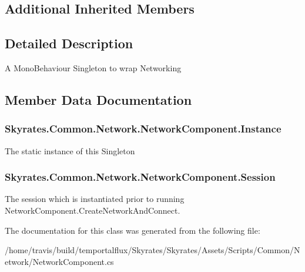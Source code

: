 \subsection*{Additional Inherited Members}


\subsection{Detailed Description}
A Mono\-Behaviour Singleton to wrap Networking 



\subsection{Member Data Documentation}
\hypertarget{class_skyrates_1_1_common_1_1_network_1_1_network_component_a92cfb5ea7ee95888c7d9356e6e1add2f}{
\subsubsection[{Instance}]{ Skyrates.\-Common.\-Network.\-Network\-Component.\-Instance\hspace{0.3cm}{\ttfamily [static]}}}\label{class_skyrates_1_1_common_1_1_network_1_1_network_component_a92cfb5ea7ee95888c7d9356e6e1add2f}


The static instance of this Singleton 

\hypertarget{class_skyrates_1_1_common_1_1_network_1_1_network_component_ab7c94c6c60a85549f3b7d22d1efcab05}{
\subsubsection[{Session}]{ Skyrates.\-Common.\-Network.\-Network\-Component.\-Session}}\label{class_skyrates_1_1_common_1_1_network_1_1_network_component_ab7c94c6c60a85549f3b7d22d1efcab05}


The session which is instantiated prior to running Network\-Component.\-Create\-Network\-And\-Connect. 



The documentation for this class was generated from the following file\-:\begin{DoxyCompactItemize}
\item 
/home/travis/build/temportalflux/\-Skyrates/\-Skyrates/\-Assets/\-Scripts/\-Common/\-Network/Network\-Component.\-cs\end{DoxyCompactItemize}

